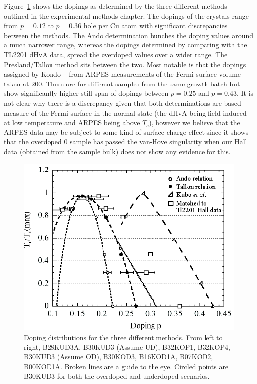 Figure~\ref{Fig:ResH:Dopings} shows the dopings as determined by the three different methods outlined in the experimental methods chapter. The dopings of the crystals range from $p=0.12$ to $p=0.36$ hole per Cu atom with significant discrepancies between the methods. The Ando determination bunches the doping values around a much narrower range, whereas the dopings determined by comparing with the \ac{TL2201} \ac{dHvA} data, spread the overdoped values over a wider range. The Presland/Tallon method sits between the two. Most notable is that the dopings assigned by Kondo \etal~\cite{Kondo2004} from \ac{ARPES} measurements of the Fermi surface volume taken at \unit{200}{\kelvin}. These are for different samples from the same growth batch but show significantly higher still span of dopings between $p=0.25$ and $p=0.43$. It is not clear why there is a discrepancy given that both determinations are based measure of the Fermi surface in the normal state (the \ac{dHvA} being field induced at low temperature and \ac{ARPES} being above $T_c$), however we believe that the \ac{ARPES} data may be subject to some kind of surface charge effect since it shows that the overdoped \unit{0}{\kelvin} sample has passed the van-Hove singularity when our Hall data (obtained from the sample bulk) does not show any evidence for this.

\begin{figure}[htbp]
    \begin{center}
        \includegraphics[scale=1.1]{Chapter-HallBSCO/Figures/Dopings/Dopings}
        \caption{Doping distributions for the three different methods. From left to right, B28KUD3A, B30KUD3 (Assume UD), B32KOP1, B32KOP4, B30KUD3 (Assume OD), B30KOD3, B16KOD1A, B07KOD2, B00KOD1A. Broken lines are a guide to the eye. Circled points are B30KUD3 for both the overdoped and underdoped scenarios.}
        \label{Fig:ResH:Dopings}
    \end{center}
\end{figure}

